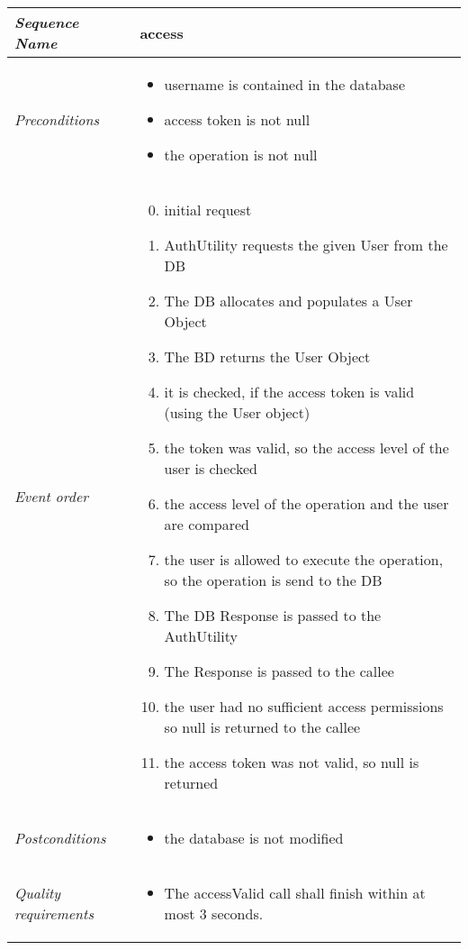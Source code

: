 				\begin{tabular}{|p{}|p{}|}
					\hline
					\textit{Sequence Name}&\textbf{access}\\
					\hline
					\textit{Preconditions}&
					\begin{itemize}
						\setcounter{enumi}{-1}
						\item username is contained in the database
						\item access token is not null
						\item the operation is not null
					\end{itemize}\\
					\hline
					\textit{Event order}&
					\begin{enumerate}[label*=1.\arabic*]
						\setcounter{enumi}{-1}
						\item initial request
						\item AuthUtility requests the given User from the DB
						\item The DB allocates and populates a User Object
						\item The BD returns the User Object
						\item it is checked, if the access token is valid (using the User object)
						\addtocounter{enumi}{1}
						\item the token was valid, so the access level of the user is checked
						\addtocounter{enumi}{1}
						\item the access level of the operation and the user are compared
						\item the user is allowed to execute the operation, so the operation is send to the DB
						\item The DB Response is passed to the AuthUtility
						\item The Response is passed to the callee
						\item the user had no sufficient access permissions so null is returned to the callee
						\item the access token was not valid, so null is returned
					\end{enumerate}\\
					\hline
					\textit{Postconditions}&
					\begin{itemize}
						\item the database is not modified
					\end{itemize}\\
					\hline
					\textit{Quality requirements}&
					\begin{itemize}
						\item The accessValid call shall finish within at most 3 seconds.
					\end{itemize}\\
					\hline
				\end{tabular}
